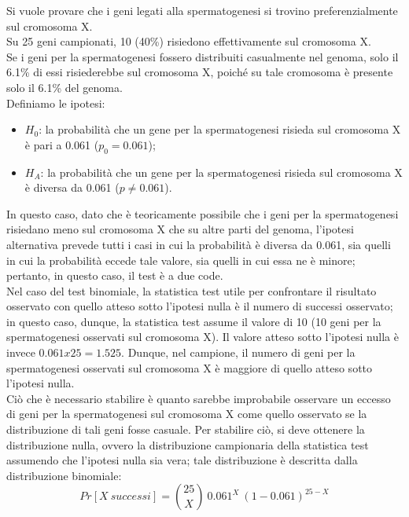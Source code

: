 \documentclass[10pt, draft]{book}
\newcounter{example}[section]
\begin{document}
\begin{example}
    Si vuole provare che i geni legati alla spermatogenesi si trovino preferenzialmente sul cromosoma X.
    \\
    Su 25 geni campionati, 10 (40\%) risiedono effettivamente sul cromosoma X.
    \\
    Se i geni per la spermatogenesi fossero distribuiti casualmente nel genoma, solo il 6.1\% di essi risiederebbe sul cromosoma X, poiché su tale cromosoma è presente solo il 6.1\% del genoma.
    \\
    Definiamo le ipotesi:
    \begin{itemize}
    \item $H_0$: la probabilità che un gene per la spermatogenesi risieda sul cromosoma X è pari a 0.061 ($p_0 = 0.061$);
    \item $H_A$: la probabilità che un gene per la spermatogenesi risieda sul cromosoma X è diversa da 0.061 ($p\ne 0.061$).
    \end{itemize}
    In questo caso, dato che è teoricamente possibile che i geni per la spermatogenesi risiedano meno sul cromosoma X che su altre parti del genoma, l'ipotesi alternativa prevede tutti i casi in cui la probabilità è diversa da 0.061, sia quelli in cui la probabilità eccede tale valore, sia quelli in cui essa ne è minore; pertanto, in questo caso, il test è a due code.
    \\
    Nel caso del test binomiale, la statistica test utile per confrontare il risultato osservato con quello atteso sotto l'ipotesi nulla è il numero di successi osservato; in questo caso, dunque, la statistica test assume il valore di 10 (10 geni per la spermatogenesi osservati sul cromosoma X). Il valore atteso sotto l'ipotesi nulla è invece $0.061 x 25 = 1.525$. Dunque, nel campione, il numero di geni per la spermatogenesi osservati sul cromosoma X è maggiore di quello atteso sotto l'ipotesi nulla.
    \\
    Ciò che è necessario stabilire è quanto sarebbe improbabile osservare un eccesso di geni per la spermatogenesi sul cromosoma X come quello osservato se la distribuzione di tali geni fosse casuale. Per stabilire ciò, si deve ottenere la distribuzione nulla, ovvero la distribuzione campionaria della statistica test assumendo che l'ipotesi nulla sia vera; tale distribuzione è descritta dalla distribuzione binomiale:
    \begin{equation}
    Pr[X \ successi] = \binom{25}{X}\ 0.061^X \ (1-0.061)^{25 - X}
    \end{equation}

\end{example}
\end{document}
